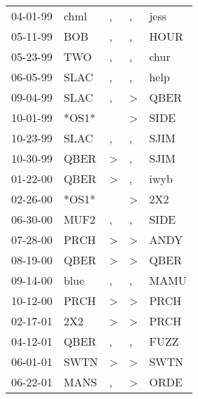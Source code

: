 \begin{supertabular}{lllll}
 04-01-99 &   chml &             , &             , &  jess \\
 05-11-99 &    BOB &             , &             , &  HOUR \\
 05-23-99 &    TWO &             , &             , &  chur \\
 06-05-99 &   SLAC &             , &             , &  help \\
 09-04-99 &   SLAC &             , &  \textgreater &  QBER \\
 10-01-99 &  *OS1* &               &  \textgreater &  SIDE \\
 10-23-99 &   SLAC &             , &             , &  SJIM \\
 10-30-99 &   QBER &  \textgreater &             , &  SJIM \\
 01-22-00 &   QBER &  \textgreater &             , &  iwyb \\
 02-26-00 &  *OS1* &               &  \textgreater &   2X2 \\
 06-30-00 &   MUF2 &             , &             , &  SIDE \\
 07-28-00 &   PRCH &  \textgreater &  \textgreater &  ANDY \\
 08-19-00 &   QBER &  \textgreater &  \textgreater &  QBER \\
 09-14-00 &   blue &             , &             , &  MAMU \\
 10-12-00 &   PRCH &  \textgreater &  \textgreater &  PRCH \\
 02-17-01 &    2X2 &  \textgreater &  \textgreater &  PRCH \\
 04-12-01 &   QBER &             , &             , &  FUZZ \\
 06-01-01 &   SWTN &  \textgreater &  \textgreater &  SWTN \\
 06-22-01 &   MANS &             , &  \textgreater &  ORDE \\
\end{supertabular}
